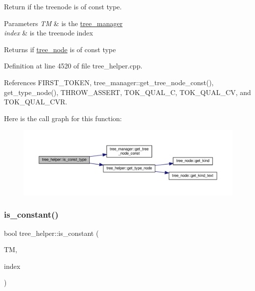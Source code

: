 Return if the treenode is of const type. 


\begin{DoxyParams}{Parameters}
{\em TM} & is the \hyperlink{classtree__manager}{tree\+\_\+manager} \\
\hline
{\em index} & is the treenode index \\
\hline
\end{DoxyParams}
\begin{DoxyReturn}{Returns}
if \hyperlink{classtree__node}{tree\+\_\+node} is of const type 
\end{DoxyReturn}


Definition at line 4520 of file tree\+\_\+helper.\+cpp.



References F\+I\+R\+S\+T\+\_\+\+T\+O\+K\+EN, tree\+\_\+manager\+::get\+\_\+tree\+\_\+node\+\_\+const(), get\+\_\+type\+\_\+node(), T\+H\+R\+O\+W\+\_\+\+A\+S\+S\+E\+RT, T\+O\+K\+\_\+\+Q\+U\+A\+L\+\_\+C, T\+O\+K\+\_\+\+Q\+U\+A\+L\+\_\+\+CV, and T\+O\+K\+\_\+\+Q\+U\+A\+L\+\_\+\+C\+VR.

Here is the call graph for this function\+:
\nopagebreak
\begin{figure}[H]
\begin{center}
\leavevmode
\includegraphics[width=350pt]{d7/d99/classtree__helper_a3553400cf2831632a96c6ceed46aa60b_cgraph}
\end{center}
\end{figure}
\mbox{\label{classtree__helper_a2a4c47da4a2b504b5700a9f3ee5e9463}} 
\subsubsection{\texorpdfstring{is\+\_\+constant()}{is\_constant()}}
{\footnotesize\ttfamily bool tree\+\_\+helper\+::is\+\_\+constant (\begin{DoxyParamCaption}\item[{const \hyperlink{tree__manager_8hpp_a792e3f1f892d7d997a8d8a4a12e39346}{tree\+\_\+manager\+Const\+Ref} \&}]{TM,  }\item[{const unsigned int}]{index }\end{DoxyParamCaption})\hspace{0.3cm}{\ttfamily [static]}}



